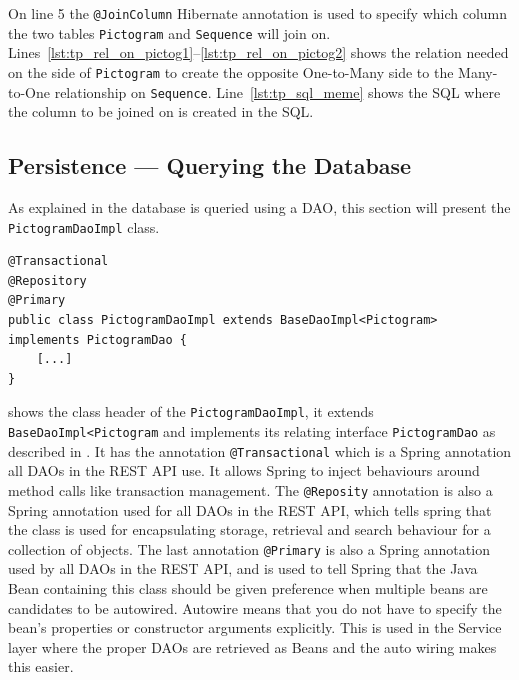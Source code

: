 On line 5 the \texttt{@JoinColumn} Hibernate annotation is used to specify which column the two tables \texttt{Pictogram} and \texttt{Sequence} will join on.
Lines~\ref{lst:tp_rel_on_pictog1}--\ref{lst:tp_rel_on_pictog2} shows the relation needed on the side of \texttt{Pictogram} to create the opposite One-to-Many side to the Many-to-One relationship on \texttt{Sequence}.
Line~\ref{lst:tp_sql_meme} shows the SQL where the column to be joined on is created in the SQL.

\subsection{Persistence --- Querying the Database}
As explained in  the database is queried using a DAO, this section will present the \texttt{PictogramDaoImpl} class.

\begin{lstlisting}[float, floatplacement=h, caption={The class header of the \texttt{PictogramDao}, along with its annotations. \texttt{[...]} denotes omitted code.},label={lst:pictogramDaoImpl}]
@Transactional
@Repository
@Primary
public class PictogramDaoImpl extends BaseDaoImpl<Pictogram> implements PictogramDao {
	[...]
}
\end{lstlisting}

 shows the class header of the \texttt{PictogramDaoImpl}, it extends \texttt{BaseDaoImpl<Pictogram} and implements its relating interface \texttt{PictogramDao} as described in .
It has the annotation \texttt{@Transactional} which is a Spring annotation all DAOs in the REST API use.
It allows Spring to inject behaviours around method calls like transaction management.
The \texttt{@Reposity} annotation is also a Spring annotation used for all DAOs in the REST API, which tells spring that the class is used for encapsulating storage, retrieval and search behaviour for a collection of objects.
The last annotation \texttt{@Primary} is also a Spring annotation used by all DAOs in the REST API, and is used to tell Spring that the Java Bean  containing this class should be given preference when multiple beans are candidates to be autowired.
Autowire means that you do not have to specify the bean's properties or constructor arguments explicitly.
This is used in the Service layer where the proper DAOs are retrieved as Beans and the auto wiring makes this easier.

